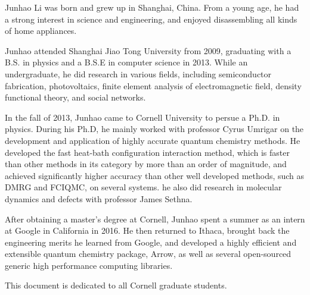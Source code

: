 \documentclass[phd,tocprelim]{cornell}
\begin{document}
\begin{biosketch}
Junhao Li was born and grew up in Shanghai, China.
From a young age, he had a strong interest in science and engineering, and enjoyed disassembling all kinds of home appliances.

Junhao attended Shanghai Jiao Tong University from 2009, graduating with a B.S. in physics and a B.S.E in computer science in 2013.
While an undergraduate, he did research in various fields, including semiconductor fabrication, photovoltaics, finite element analysis of electromagnetic field, density functional theory, and social networks.

In the fall of 2013, Junhao came to Cornell University to persue a Ph.D. in physics.
During his Ph.D, he mainly worked with professor Cyrus Umrigar on the development and application of highly accurate quantum chemistry methods.
He developed the fast heat-bath configuration interaction method, which is faster than other methods in its category by more than an order of magnitude, and achieved significantly higher accuracy than other well developed methods, such as DMRG and FCIQMC, on several systems.
he also did research in molecular dynamics and defects with professor James Sethna.

After obtaining a master's degree at Cornell, Junhao spent a summer as an intern at Google in California in 2016.
He then returned to Ithaca, brought back the engineering merits he learned from Google, and developed a highly efficient and extensible quantum chemistry package, Arrow, as well as several open-sourced generic high performance computing libraries.
\end{biosketch}

\begin{dedication}
This document is dedicated to all Cornell graduate students.
\end{dedication}
\end{document}
